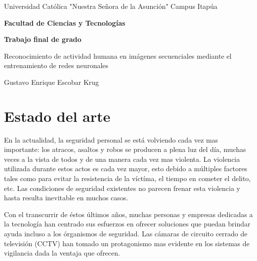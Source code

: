 \documentclass[a4paper,12pt,twoside]{article}
\begin{document}
	\begin{center}
		{\LARGE {Universidad Católica "Nuestra Señora de la Asunción" Campus Itapúa}}
	\end{center}
	\vspace*{0.1cm}
	\begin{center}
		{\large \rm \textbf {Facultad de Ciencias y Tecnologías}}
	\end{center}
	\vspace*{0.2cm}
	\begin{center}
		{\large \rm \textbf {Trabajo final de grado}}
	\end{center}		
	
	\baselineskip 30pt
	\vspace*{1cm}
	\begin{center}
		{\large \rm Reconocimiento de actividad humana en imágenes secuenciales mediante el entrenamiento de redes neuronales}
	\end{center}

	\vspace*{1cm}

	\begin{center}
		{\sc  Gustavo Enrique Escobar Krug\\}
		\vspace*{0.1cm}
		
	\end{center}
	
	\pagebreak
	
	\baselineskip 16pt

	
\newpage
\setlength{\parskip}{1.3em}

\section{Estado del arte}
En la actualidad, la seguridad personal se está volviendo cada vez mas importante: los atracos, asaltos y robos se producen a plena luz del día, muchas veces a la vista de todos y de una manera cada vez mas violenta. La violencia utilizada durante estos actos es cada vez mayor, esto debido a múltiples factores tales como para evitar la resistencia de la víctíma, el tiempo en cometer el delito, etc. Las condiciones de seguridad existentes no parecen frenar esta violencia y hasta resulta inevitable en muchos casos. \par
Con el transcurrir de éstos últimos años, muchas personas y empresas dedicadas a la tecnología han centrado sus esfuerzos en ofrecer soluciones que puedan brindar ayuda incluso a los órganismos de seguridad. Las cámaras de circuito cerrado de televisión (CCTV) han tomado un protagonismo mas evidente en los sistemas de vigilancia dada la ventaja que ofrecen. \par
\end{document}
